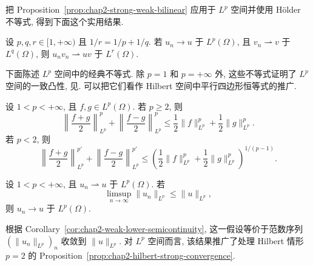 把 Proposition~\ref{prop:chap2-strong-weak-bilinear} 应用于 $L^p$ 空间并使用 Hölder 不等式, 得到下面这个实用结果.

\begin{Proposition}
\label{prop:chap2-lp-strong-times-weak}
设 $p,q,r\in[1,+\infty)$ 且 $1/r=1/p+1/q$. 若 $u_n\to u$ 于 $L^p(\Omega)$, 且 $v_n\rightharpoonup v$ 于 $L^q(\Omega)$, 则 $u_nv_n\rightharpoonup uv$ 于 $L^r(\Omega)$.
\end{Proposition}

下面陈述 $L^p$ 空间中的经典不等式. 除 $p=1$ 和 $p=+\infty$ 外, 这些不等式证明了 $L^p$ 空间的一致凸性, 见. 可以把它们看作 Hilbert 空间中平行四边形恒等式的推广.

\begin{Lemma}
\label{lem:chap2-clarkson-inequalities}
设 $1<p<+\infty$, 且 $f,g\in L^p(\Omega)$. 若 $p\geq2$, 则
\[
 \left\|\frac{f+g}{2}\right\|_{L^p}^p+\left\|\frac{f-g}{2}\right\|_{L^p}^p
 \leq\frac12\|f\|_{L^p}^p+\frac12\|g\|_{L^p}^p.
\]
若 $p<2$, 则
\[
 \left\|\frac{f+g}{2}\right\|_{L^p}^{p'}+\left\|\frac{f-g}{2}\right\|_{L^p}^{p'}
 \leq\left(\frac12\|f\|_{L^p}^p+\frac12\|g\|_{L^p}^p\right)^{1/(p-1)}.
\]
\end{Lemma}

\begin{Proposition}
\label{prop:chap2-weak-plus-norm-implies-strong-lp}
设 $1<p<+\infty$, 且 $u_n\rightharpoonup u$ 于 $L^p(\Omega)$. 若
\[
 \limsup_{n\to\infty}\|u_n\|_{L^p}\leq\|u\|_{L^p},
\]
则 $u_n\to u$ 于 $L^p(\Omega)$.
\end{Proposition}

根据 Corollary~\ref{cor:chap2-weak-lower-semicontinuity}, 这一假设等价于范数序列 $(\|u_n\|_{L^p})_n$ 收敛到 $\|u\|_{L^p}$. 对 $L^p$ 空间而言, 该结果推广了处理 Hilbert 情形 $p=2$ 的 Proposition~\ref{prop:chap2-hilbert-strong-convergence}.

